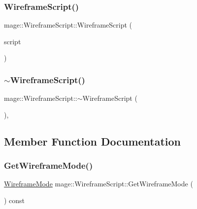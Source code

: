 \subsubsection{\texorpdfstring{Wireframe\+Script()}{WireframeScript()}\hspace{0.1cm}{\footnotesize\ttfamily [3/3]}}
{\footnotesize\ttfamily mage\+::\+Wireframe\+Script\+::\+Wireframe\+Script (\begin{DoxyParamCaption}\item[{\hyperlink{classmage_1_1_wireframe_script}{Wireframe\+Script} \&\&}]{script }\end{DoxyParamCaption})\hspace{0.3cm}{\ttfamily [default]}}

\hypertarget{classmage_1_1_wireframe_script_abbb814f01dce03195e83b24bf244757f}{}\label{classmage_1_1_wireframe_script_abbb814f01dce03195e83b24bf244757f} 
\subsubsection{\texorpdfstring{$\sim$\+Wireframe\+Script()}{~WireframeScript()}}
{\footnotesize\ttfamily mage\+::\+Wireframe\+Script\+::$\sim$\+Wireframe\+Script (\begin{DoxyParamCaption}{ }\end{DoxyParamCaption})\hspace{0.3cm}{\ttfamily [virtual]}, {\ttfamily [default]}}



\subsection{Member Function Documentation}
\hypertarget{classmage_1_1_wireframe_script_a1f9553ffde0bfd70ee55ce653fa06dd7}{}\label{classmage_1_1_wireframe_script_a1f9553ffde0bfd70ee55ce653fa06dd7} 
\subsubsection{\texorpdfstring{Get\+Wireframe\+Mode()}{GetWireframeMode()}}
{\footnotesize\ttfamily \hyperlink{classmage_1_1_wireframe_script_a99d65e77e89c2581544e68030adcefb7}{Wireframe\+Mode} mage\+::\+Wireframe\+Script\+::\+Get\+Wireframe\+Mode (\begin{DoxyParamCaption}{ }\end{DoxyParamCaption}) const}


